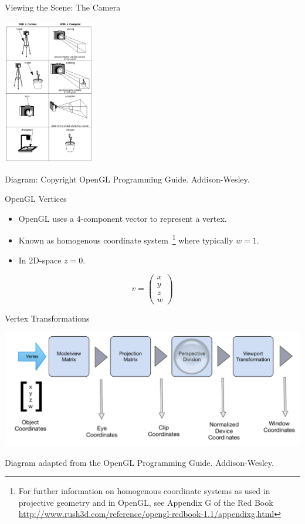 \documentclass[aspectratio=1610,xcolor=dvipsnames,t]{beamer}
\begin{document}
\begin{frame}{Viewing the Scene: The Camera}
    \begin{center}
        \includegraphics[width=0.3\textwidth]{camera} 
    \end{center} 
    \tiny
    Diagram: Copyright OpenGL Programming Guide. Addison-Wesley. 
    \normalsize
\end{frame} 

\begin{frame}{OpenGL Vertices} 
    \begin{itemize}
        \item OpenGL uses a 4-component vector to represent a vertex.
        \item Known as homogenous coordinate system~\footnote{For 
            further information on homogenous coordinate systems as 
            used in projective geometry and in OpenGL, see Appendix G of the Red Book
            \url{http://www.rush3d.com/reference/opengl-redbook-1.1/appendixg.html} } 
            where typically $w=1$.
        \item In 2D-space $z=0$.
    \end{itemize} 
    \begin{equation*}
        v = \left( 
                \begin{array}{c}
                x \\
                y \\
                z \\
                w
                \end{array}
            \right)
    \end{equation*} 
\end{frame} 

\begin{frame}{Vertex Transformations} 
    \begin{center}
        \includegraphics[width=\textwidth]{vertextransform} 
    \end{center} 
    \tiny
    Diagram adapted from the OpenGL Programming Guide. Addison-Wesley. 
    \normalsize
\end{frame} 
\end{document}
